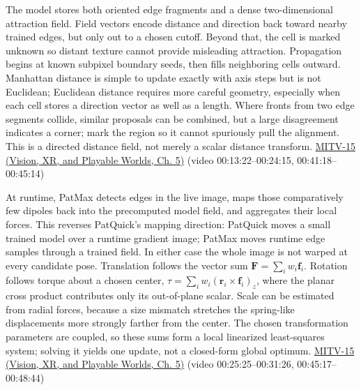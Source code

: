 The model stores both oriented edge fragments and a dense two-dimensional attraction field. Field vectors encode distance and direction back toward nearby trained edges, but only out to a chosen cutoff. Beyond that, the cell is marked unknown so distant texture cannot provide misleading attraction. Propagation begins at known subpixel boundary seeds, then fills neighboring cells outward. Manhattan distance is simple to update exactly with axis steps but is not Euclidean; Euclidean distance requires more careful geometry, especially when each cell stores a direction vector as well as a length. Where fronts from two edge segments collide, similar proposals can be combined, but a large disagreement indicates a corner; mark the region so it cannot spuriously pull the alignment. This is a directed distance field, not merely a scalar distance transform. \href{../07-Vision-XR-and-Playable-Worlds/main.pdf\#nameddest=04-visual-computing-ii-ch036-mitv-15---alignment-patmax-distance-field-filtering-and-sub-sampling-us-7065262}{MITV-15 (Vision, XR, and Playable Worlds, Ch. 5)} (video 00:13:22--00:24:15, 00:41:18--00:45:14)

At runtime, PatMax detects edges in the live image, maps those comparatively few dipoles back into the precomputed model field, and aggregates their local forces. This reverses PatQuick's mapping direction: PatQuick moves a small trained model over a runtime gradient image; PatMax moves runtime edge samples through a trained field. In either case the whole image is not warped at every candidate pose. Translation follows the vector sum \(\mathbf{F}=\sum_i w_i\mathbf{f}_i\). Rotation follows torque about a chosen center, \(\tau=\sum_i w_i(\mathbf{r}_i\times\mathbf{f}_i)_z\), where the planar cross product contributes only its out-of-plane scalar. Scale can be estimated from radial forces, because a size mismatch stretches the spring-like displacements more strongly farther from the center. The chosen transformation parameters are coupled, so these sums form a local linearized least-squares system; solving it yields one update, not a closed-form global optimum. \href{../07-Vision-XR-and-Playable-Worlds/main.pdf\#nameddest=04-visual-computing-ii-ch036-mitv-15---alignment-patmax-distance-field-filtering-and-sub-sampling-us-7065262}{MITV-15 (Vision, XR, and Playable Worlds, Ch. 5)} (video 00:25:25--00:31:26, 00:45:17--00:48:44)

